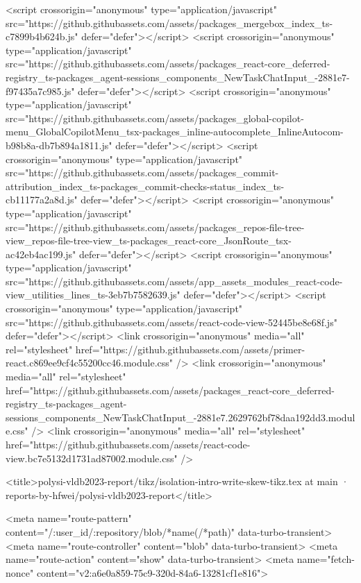 <script crossorigin="anonymous" type="application/javascript" src="https://github.githubassets.com/assets/packages_mergebox_index_ts-c7899b4b624b.js" defer="defer"></script>
<script crossorigin="anonymous" type="application/javascript" src="https://github.githubassets.com/assets/packages_react-core_deferred-registry_ts-packages_agent-sessions_components_NewTaskChatInput_-2881e7-f97435a7c985.js" defer="defer"></script>
<script crossorigin="anonymous" type="application/javascript" src="https://github.githubassets.com/assets/packages_global-copilot-menu_GlobalCopilotMenu_tsx-packages_inline-autocomplete_InlineAutocom-b98b8a-db7b894a1811.js" defer="defer"></script>
<script crossorigin="anonymous" type="application/javascript" src="https://github.githubassets.com/assets/packages_commit-attribution_index_ts-packages_commit-checks-status_index_ts-cb11177a2a8d.js" defer="defer"></script>
<script crossorigin="anonymous" type="application/javascript" src="https://github.githubassets.com/assets/packages_repos-file-tree-view_repos-file-tree-view_ts-packages_react-core_JsonRoute_tsx-ac42eb4ac199.js" defer="defer"></script>
<script crossorigin="anonymous" type="application/javascript" src="https://github.githubassets.com/assets/app_assets_modules_react-code-view_utilities_lines_ts-3eb7b7582639.js" defer="defer"></script>
<script crossorigin="anonymous" type="application/javascript" src="https://github.githubassets.com/assets/react-code-view-52445be8e68f.js" defer="defer"></script>
<link crossorigin="anonymous" media="all" rel="stylesheet" href="https://github.githubassets.com/assets/primer-react.c869ee9cf4c55200cc46.module.css" />
<link crossorigin="anonymous" media="all" rel="stylesheet" href="https://github.githubassets.com/assets/packages_react-core_deferred-registry_ts-packages_agent-sessions_components_NewTaskChatInput_-2881e7.2629762bf78daa192dd3.module.css" />
<link crossorigin="anonymous" media="all" rel="stylesheet" href="https://github.githubassets.com/assets/react-code-view.bc7e5132d1731ad87002.module.css" />


  <title>polysi-vldb2023-report/tikz/isolation-intro-write-skew-tikz.tex at main · reports-by-hfwei/polysi-vldb2023-report</title>



  <meta name="route-pattern" content="/:user_id/:repository/blob/*name(/*path)" data-turbo-transient>
  <meta name="route-controller" content="blob" data-turbo-transient>
  <meta name="route-action" content="show" data-turbo-transient>
  <meta name="fetch-nonce" content="v2:a6e0a859-75c9-320d-84a6-13281cf1e816">

